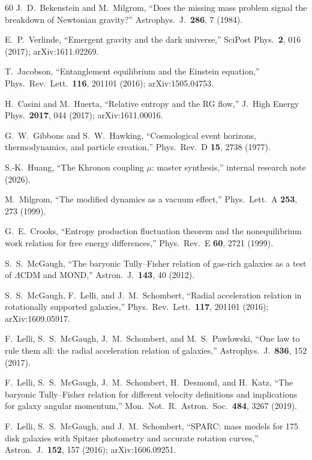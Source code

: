 \documentclass[prd,twocolumn,superscriptaddress,longbibliography,floatfix]{revtex4-2}
\begin{document}
\begin{thebibliography}{60}
J.~D.~Bekenstein and M.~Milgrom,
``Does the missing mass problem signal the breakdown of
Newtonian gravity?''
Astrophys.\ J.\ \textbf{286}, 7 (1984).

E.~P.~Verlinde,
``Emergent gravity and the dark universe,''
SciPost Phys.\ \textbf{2}, 016 (2017);
arXiv:1611.02269.

T.~Jacobson,
``Entanglement equilibrium and the Einstein equation,''
Phys.\ Rev.\ Lett.\ \textbf{116}, 201101 (2016);
arXiv:1505.04753.

H.~Casini and M.~Huerta,
``Relative entropy and the RG flow,''
J.\ High Energy Phys.\ \textbf{2017}, 044 (2017);
arXiv:1611.00016.

G.~W.~Gibbons and S.~W.~Hawking,
``Cosmological event horizons, thermodynamics, and particle
creation,''
Phys.\ Rev.\ D \textbf{15}, 2738 (1977).

S.-K.~Huang,
``The Khronon coupling $\mu$: master synthesis,''
internal research note (2026).

M.~Milgrom,
``The modified dynamics as a vacuum effect,''
Phys.\ Lett.\ A \textbf{253}, 273 (1999).

G.~E.~Crooks,
``Entropy production fluctuation theorem and the nonequilibrium
work relation for free energy differences,''
Phys.\ Rev.\ E \textbf{60}, 2721 (1999).

S.~S.~McGaugh,
``The baryonic Tully--Fisher relation of gas-rich galaxies as a
test of $\Lambda$CDM and MOND,''
Astron.\ J.\ \textbf{143}, 40 (2012).

S.~S.~McGaugh, F.~Lelli, and J.~M.~Schombert,
``Radial acceleration relation in rotationally supported galaxies,''
Phys.\ Rev.\ Lett.\ \textbf{117}, 201101 (2016);
arXiv:1609.05917.

F.~Lelli, S.~S.~McGaugh, J.~M.~Schombert, and M.~S.~Pawlowski,
``One law to rule them all: the radial acceleration relation
of galaxies,''
Astrophys.\ J.\ \textbf{836}, 152 (2017).

F.~Lelli, S.~S.~McGaugh, J.~M.~Schombert, H.~Desmond,
and H.~Katz,
``The baryonic Tully--Fisher relation for different velocity
definitions and implications for galaxy angular momentum,''
Mon.\ Not.\ R.\ Astron.\ Soc.\ \textbf{484}, 3267 (2019).

F.~Lelli, S.~S.~McGaugh, and J.~M.~Schombert,
``SPARC: mass models for 175 disk galaxies with Spitzer
photometry and accurate rotation curves,''
Astron.\ J.\ \textbf{152}, 157 (2016);
arXiv:1606.09251.


\end{thebibliography}
\end{document}
